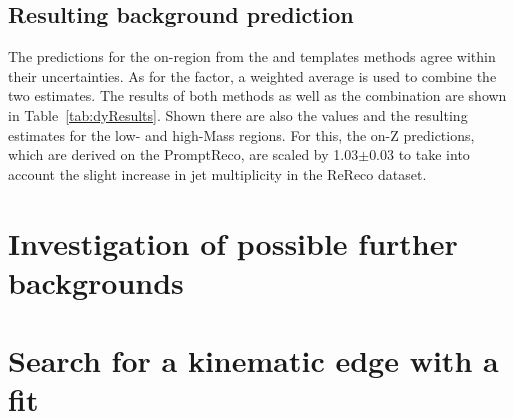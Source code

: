 \subsection{Resulting background prediction}
The predictions for the on-\Z region from the \JZB and \MET templates methods agree within their uncertainties. As for the \Rsfof factor, a weighted average is used to combine the two estimates. The results of both methods as well as the combination are shown in Table~\ref{tab:dyResults}. Shown there are also the \Routin values and the resulting estimates for the low- and high-Mass regions. For this, the on-Z predictions, which are derived on the PromptReco, are scaled by 1.03$\pm$0.03 to take into account the slight increase in jet multiplicity in the ReReco dataset. 




\section{Investigation of possible further backgrounds}
\section{Search for a kinematic edge with a fit}

